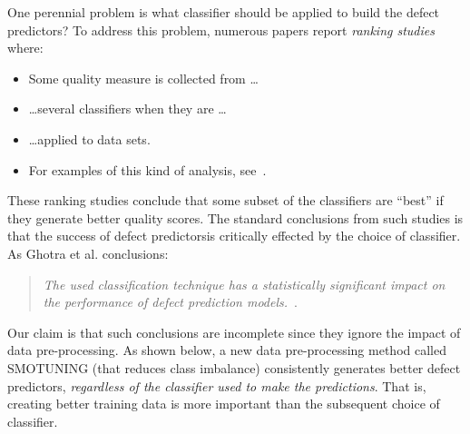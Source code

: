 \documentclass[10pt,conference]{IEEEtran}
\newcommand{\bi}{\begin{itemize}[leftmargin=0.4cm]}
\newcommand{\ei}{\end{itemize}}
\theoremstyle{break}
\theoremstyle{break}
\begin{document}
One perennial problem   is what classifier should be applied to build the defect predictors?
To address this problem, numerous papers report {\em ranking studies} where:
\bi
\item
Some quality measure  is collected from \ldots
\item
\ldots several  classifiers when they are \dots
\item
\ldots applied to data sets.
\item
For examples of this kind of analysis, see~\cite{lessmann2008benchmarking,hall2012systematic,elish2008predicting,menzies2010defect,gondra2008applying,radjenovic2013software,jiang2008techniques,wang2013using,mende2009revisiting,li2012sample,khoshgoftaar2010attribute,jiang2009variance,ghotra2015revisiting,jiang2008can,tantithamthavorn2016automated,fu2016tuning}.
\ei
These ranking studies conclude that some subset of the classifiers
are  ``best'' if they generate  better quality scores.
The standard conclusions from such studies is that 
 the success of defect predictorsis critically
effected by the choice of classifier. As Ghotra et al. conclusions:

\begin{quote}{\em The  used classification
technique has a statistically significant impact
on the performance of defect prediction models.}~\cite{ghotra2015revisiting}.
\end{quote}

Our claim is that such conclusions are incomplete since
they ignore the impact of  
data pre-processing. As shown below,
a new data pre-processing method called SMOTUNING
(that reduces
class imbalance) consistently generates better 
defect predictors,
{\em regardless of the classifier used
to make the predictions}.  That is,  creating better training data is more important
than the subsequent choice of classifier. 
 
\end{document}
